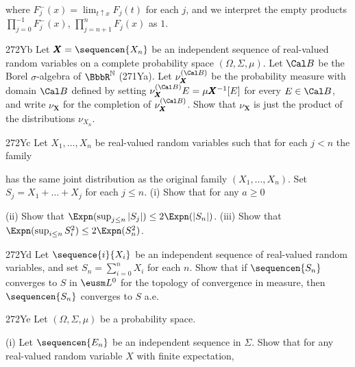 {

\noindent where $F_j^{-}(x)=\lim_{t\uparrow x}F_j(t)$ for each $j$, and
we interpret the empty products $\prod_{j=0}^{-1}F_j^{-}(x)$,
$\prod_{j=n+1}^nF_j(x)$ as $1$.

\spheader 272Yb
Let $\pmb{X}=\sequencen{X_n}$ be an independent
sequence of real-valued random variables on a complete probability space
$(\Omega,\Sigma,\mu)$.   Let $\Cal B$ be the Borel $\sigma$-algebra of
$\BbbR^{\Bbb N}$ (271Ya).   Let $\nu_{\pmb{X}}^{(\Cal B)}$ be the
probability measure with domain $\Cal B$ defined by setting
$\nu_{\pmb{X}}^{(\Cal B)}E=\mu\pmb{X}^{-1}[E]$ for every $E\in\Cal B$,
and write $\nu_{\pmb{X}}$ for the completion of $\nu_{\pmb{X}}^{(\Cal
B)}$.   Show that $\nu_{\pmb{X}}$ is just the product of the
distributions $\nu_{X_n}$.

\spheader 272Yc
Let $X_1,\ldots,X_n$ be real-valued random variables such
that for each $j<n$ the family


\noindent has the same joint distribution as the original family
$(X_1,\ldots,X_n)$.   Set $S_j=X_1+\ldots+X_j$ for each $j\le n$.   (i)
Show that for any $a\ge 0$


\noindent {}
(ii) Show that $\Expn(\sup_{j\le n}|S_j|)\le 2\Expn(|S_n|)$.  (iii)
Show that $\Expn(\sup_{i\le n}S_i^2)\le 2\Expn(S_n^2)$.

\spheader 272Yd
Let $\sequence{i}{X_i}$ be an independent sequence of
real-valued random variables, and set $S_n=\sum_{i=0}^nX_i$ for each $n$.
Show that if $\sequencen{S_n}$ converges to $S$ in $\eusm L^0$
for the topology of convergence in measure,
then $\sequencen{S_n}$ converges to $S$ a.e.

\spheader 272Ye
Let $(\Omega,\Sigma,\mu)$ be a probability space.

\quad (i) Let $\sequencen{E_n}$ be an independent sequence in $\Sigma$.
Show that for any real-valued random variable $X$ with finite
expectation,

}

